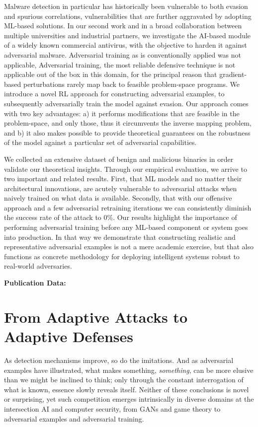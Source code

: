 Malware detection in particular has historically been vulnerable to both evasion and spurious correlations, vulnerabilities that are further aggravated by adopting ML-based solutions.
In our second work and in a broad collaboration between multiple universities and industrial partners, we investigate the \gls{AI}-based module of a widely known commercial antivirus, with the objective to harden it against adversarial malware.
Adversarial training as is conventionally applied was not applicable,
Adversarial training, the most reliable defensive technique is not applicable out of the box in this domain, for the principal reason that gradient-based perturbations rarely map back to feasible problem-space programs. 
We introduce a novel \gls{RL} approach for constructing adversarial examples, to subsequently adversarially train the model against evasion.
Our approach comes with two key advantages: a) it performs modifications that are feasible in the problem-space, and only those, thus it circumvents the inverse mapping problem, and b) it also makes possible to provide theoretical guarantees on the robustness of the model against a particular set of adversarial capabilities.

We collected an extensive dataset of benign and malicious binaries in order validate our theoretical insights.
Through our empirical evaluation, we arrive to two important and related results.
First, that \gls{ML} models and no matter their architectural innovations, are acutely vulnerable to adversarial attacks when naively trained on what data is available.
Secondly, that with our offensive approach and a few adversarial retraining iterations we can consistently diminish the success rate of the attack to 0\%.
Our results highlight the importance of performing adversarial training before any ML-based component or system goes into production.
In that way we demonstrate that constructing realistic and representative adversarial examples is not a mere academic exercise, but that also functions as concrete methodology for deploying intelligent systems robust to real-world adversaries.

\textbf{Publication Data:} 

\section{From Adaptive Attacks to Adaptive Defenses}

As detection mechanisms improve, so do the imitations.
And as adversarial examples have illustrated, what makes something, \textit{something}, can be more elusive than we might be inclined to think; only through the constant interrogation of what is known, essence slowly reveals itself.
Neither of these conclusions is novel or surprising, yet such competition emerges intrinsically in diverse domains at the intersection \gls{AI} and computer security, from \gls{GAN}s and game theory to adversarial examples and adversarial training.

